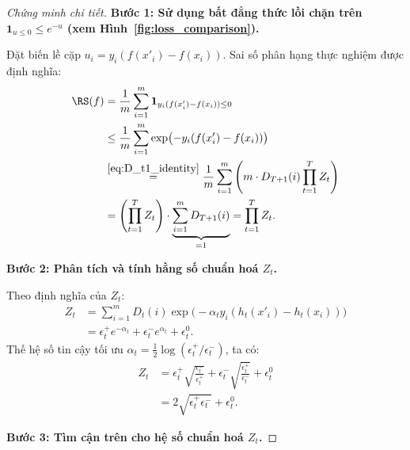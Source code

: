 \begin{proof}[Chứng minh chi tiết]
\textbf{Bước 1: Sử dụng bất đẳng thức lồi chặn trên $\mathbf{1}_{u \leq 0} \leq e^{-u}$ (xem Hình~\ref{fig:loss_comparison}).}

Đặt biến lề cặp $u_i = y_i(f(x'_i) - f(x_i))$. Sai số phân hạng thực nghiệm được định nghĩa:
\begin{align*}
    \RS(f) &= \frac{1}{m} \sum_{i=1}^m \mathbf{1}_{y_i(f(x'_i) - f(x_i)) \leq 0} \\
    &\leq \frac{1}{m} \sum_{i=1}^m \exp\bigl(-y_i(f(x'_i) - f(x_i))\bigr) \\
    &\stackrel{\eqref{eq:D_t1_identity}}{=} \frac{1}{m} \sum_{i=1}^m \left( m \cdot D_{T+1}(i) \prod_{t=1}^T Z_t \right) \\
    &= \left( \prod_{t=1}^T Z_t \right) \cdot \underbrace{\sum_{i=1}^m D_{T+1}(i)}_{=1} = \prod_{t=1}^T Z_t.
\end{align*}

\textbf{Bước 2: Phân tích và tính hằng số chuẩn hoá $Z_t$.}

Theo định nghĩa của $Z_t$:
\begin{align*}
    Z_t &= \sum_{i=1}^m D_t(i) \exp\bigl(-\alpha_t y_i(h_t(x'_i) - h_t(x_i))\bigr) \\
    &= \epsilon^+_t e^{-\alpha_t} + \epsilon^-_t e^{\alpha_t} + \epsilon^0_t.
\end{align*}
Thế hệ số tin cậy tối ưu $\alpha_t = \frac{1}{2}\log(\epsilon^+_t/\epsilon^-_t)$, ta có:
\begin{align*}
    Z_t &= \epsilon^+_t \sqrt{\frac{\epsilon^-_t}{\epsilon^+_t}} + \epsilon^-_t \sqrt{\frac{\epsilon^+_t}{\epsilon^-_t}} + \epsilon^0_t \\
    &= 2\sqrt{\epsilon^+_t \epsilon^-_t} + \epsilon^0_t.
\end{align*}

\textbf{Bước 3: Tìm cận trên cho hệ số chuẩn hoá $Z_t$.}


\end{proof}
